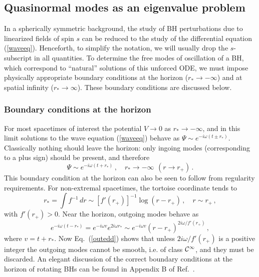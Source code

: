 \documentclass[]{iopart}
\def\be{\begin{equation}}
\def\ee{\end{equation}}
\begin{document}
\subsection{Quasinormal modes as an eigenvalue problem}

In a spherically symmetric background, the study of BH perturbations due to
linearized fields of spin $s$ can be reduced to the study of the differential
equation (\ref{waveeq}). Henceforth, to simplify the notation, we will usually
drop the $s$-subscript in all quantities.  To determine the free modes of
oscillation of a BH, which correspond to ``natural'' solutions of this
unforced ODE, we must impose physically appropriate boundary conditions at the
horizon ($r_*\to -\infty$) and at spatial infinity ($r_*\to \infty$). These
boundary conditions are discussed below.

\subsubsection*{Boundary conditions at the horizon}
%
For most spacetimes of interest the potential $V \rightarrow 0$ as $r_* \to -
\infty$, and in this limit solutions to the wave equation (\ref{waveeq})
behave as
%
$\Psi \sim e^{-i\omega (t\pm r_*)}$. Classically nothing should leave the
horizon: only ingoing modes (corresponding to a plus sign) should be present,
and therefore
%
\be \Psi \sim e^{-i\omega (t+r_*)}\,,\quad r_* \rightarrow-
\infty\,~(r\rightarrow r_+)\label{bchorizon} \,.\ee
%
This boundary condition at the horizon can also be seen to follow from
regularity requirements. For non-extremal spacetimes, the tortoise coordinate
tends to
%
\be r_*=\int f^{-1}\,dr \sim
\left[f'(r_+)\right]^{-1}\log{(r-r_+)}\,,\quad r\sim r_+ \,,\ee
%
with $f'(r_+)>0$.
Near the horizon, outgoing modes behave as
%
\be e^{-i\omega (t-r_*)}=e^{-i\omega v}e^{2i\omega r_*}\sim
e^{-i\omega v}(r-r_+)^{2i\omega/f'(r_+)}\,,\label{outedd} \ee
%
where $v=t+r_*$.  Now Eq.~(\ref{outedd}) shows that unless $2i\omega/f'(r_+)$
is a positive integer the outgoing modes cannot be smooth, i.e. of class
${\cal C}^{\infty}$, and they must be discarded.  An elegant discussion of the
correct boundary conditions at the horizon of rotating BHs can be found in
Appendix B of Ref.~\cite{Bardeen:1972fi}.
\end{document}
